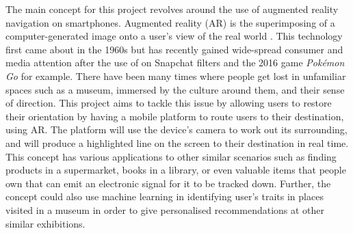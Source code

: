 
The main concept for this project revolves around the use of augmented reality navigation on smartphones. Augmented reality (AR) is the superimposing of a computer-generated image onto a user's view of the real world \cite{oxforddict}. This technology first came about in the 1960s \cite{InteractionDesign} but has recently gained wide-spread consumer and media attention after the use of on Snapchat filters \cite{Snapchat} and the 2016 game \textit{Pokémon Go} for example. There have been many times where people get lost in unfamiliar spaces such as a museum, immersed by the culture around them, and their sense of direction. This project aims to tackle this issue by allowing users to restore their orientation by having a mobile platform to route users to their destination, using AR. The platform will use the device's camera to work out its surrounding, and will produce a highlighted line on the screen to their destination in real time.\\

This concept has various applications to other similar scenarios such as finding products in a supermarket, books in a library, or even valuable items that people own that can emit an electronic signal for it to be tracked down. Further, the concept could also use machine learning in identifying user's traits in places visited in a museum in order to give personalised recommendations at other similar exhibitions.